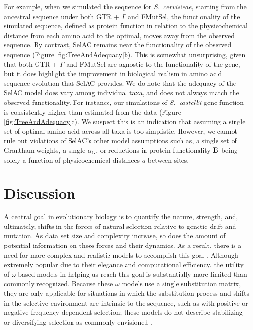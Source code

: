 \documentclass[onecolumn,letterpaper,fleqn,nogrid]{myMBE}%
\newcommand{\Func}{\ensuremath{\text{\textbf{B}}}\xspace}
\newcommand{\selac}{SelAC\xspace}
\newcommand{\alphag}{\ensuremath{\alpha_G}\xspace}
\begin{document}
For example, when we simulated the sequence for \emph{S.~cervisieae}, starting from the ancestral sequence under both GTR + $\Gamma$ and FMutSel, the functionality of the simulated sequence, defined as protein function in relation to the physicochemical distance from each amino acid to the optimal, moves away from the observed sequence.
By contrast, SelAC remains near the functionality of the observed sequence (Figure \ref{fig:TreeAndAdequacy}b).
This is somewhat unsurprising, given that both GTR + $\Gamma$ and FMutSel are agnostic to the functionality of the gene, but it does highlight the improvement in biological realism in amino acid sequence evolution that \selac provides.
We do note that the adequacy of the \selac model does vary among individual taxa, and does not always match the observed functionality.
For instance, our simulations of \emph{S.~castellii} gene function is consistently higher than estimated from the data (Figure \ref{fig:TreeAndAdequacy}c).
We suspect this is an indication that assuming a single set of optimal amino acid across all taxa is too simplistic.
However, we cannot rule out violations of \selac's other model assumptions such as, a single set of Grantham weights, a single $\alphag$, or reductions in protein functionality \Func being solely a function of physicochemical distances $d$  between sites.


\section{Discussion}
A central goal in evolutionary biology is to quantify the nature, strength, and, ultimately, shifts in the forces of natural selection relative to genetic drift and mutation.
As data set size and complexity increase, so does the amount of potential information on these forces and their dynamics.
As a result, there is a need for more complex and realistic models to accomplish this goal  \citep{GoldmanEtAl1996,ThorneEtAl1996,GoldmanEtAl1998,HalpernAndBruno1998,LartillotAndPhilippe2004}.
Although extremely popular due to their elegance and computational efficiency, the utility of $\omega$ based models in helping us reach this goal is substantially more limited than commonly recognized.
Because these $\omega$ models use a single substitution matrix, they are only applicable for situations in which the substitution process and shifts in the selective environment are intrinsic to the sequence, such as with positive or negative frequency dependent selection; these models do not describe stabilizing or diversifying selection as commonly envisioned \citep{Endler1986a,Pelmyr2002}.
\end{document}
